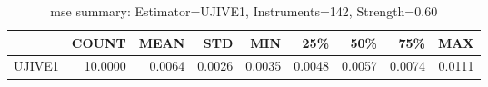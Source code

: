 \begin{table}[ht]
\centering
\caption{mse summary: Estimator=UJIVE1, Instruments=142, Strength=0.60}
\begin{tabular}{lrrrrrrrr}
\toprule
 & COUNT & MEAN & STD & MIN & 25\% & 50\% & 75\% & MAX \\
\midrule
UJIVE1 & 10.0000 & 0.0064 & 0.0026 & 0.0035 & 0.0048 & 0.0057 & 0.0074 & 0.0111 \\
\bottomrule
\end{tabular}
\end{table}
